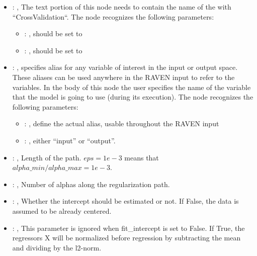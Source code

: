\begin{itemize}
    \item {}: , 
      The text portion of this node needs to contain the name of the  with
               ``CrossValidation``.
      The  node recognizes the following parameters:
        \begin{itemize}
          \item {}: , 
            should be set to 
          \item {}: , 
            should be set to 
      \end{itemize}

    \item {}: , 
      specifies alias for         any variable of interest in the input or output space. These
      aliases can be used anywhere in the RAVEN input to         refer to the variables. In the body
      of this node the user specifies the name of the variable that the model is going to use
      (during its execution).
      The  node recognizes the following parameters:
        \begin{itemize}
          \item {}: , 
            define the actual alias, usable throughout the RAVEN input
          \item {}: , 
            either ``input'' or ``output''.
      \end{itemize}

    \item {}: , 
      Length of the path. $eps=1e-3$ means that $alpha\_min / alpha\_max = 1e-3$.

    \item {}: , 
      Number of alphas along the regularization path.

    \item {}: , 
      Whether the intercept should be estimated or not. If False,
      the data is assumed to be already centered.

    \item {}: , 
      This parameter is ignored when fit\_intercept is set to False. If True,
      the regressors X will be normalized before regression by subtracting the mean and
      dividing by the l2-norm.


\end{itemize}

